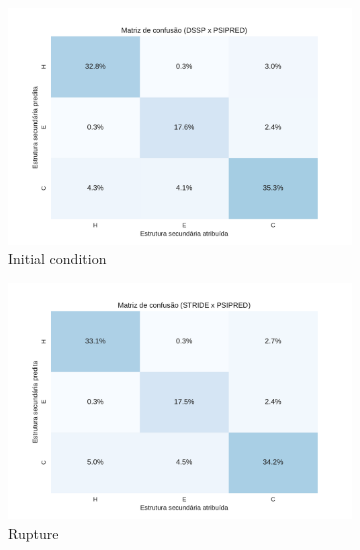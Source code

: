 \begin{figure}[ht] 
    \begin{subfigure}[b]{0.5\linewidth}
      \centering
      \includegraphics[width=1.0\linewidth]{../figures/psipred_dssp_confusion_matrix.pdf} 
      \caption{Initial condition} 
      \label{fig7:a} 
      \vspace{4ex}
    \end{subfigure}%
    \begin{subfigure}[b]{0.5\linewidth}
      \centering
      \includegraphics[width=1.0\linewidth]{../figures/psipred_stride_confusion_matrix.pdf} 
      \caption{Rupture} 
      \label{fig7:b} 
      \vspace{4ex}
    \end{subfigure} 
    \begin{subfigure}[b]{0.5\linewidth}
      \centering

\end{subfigure}
\end{figure}
